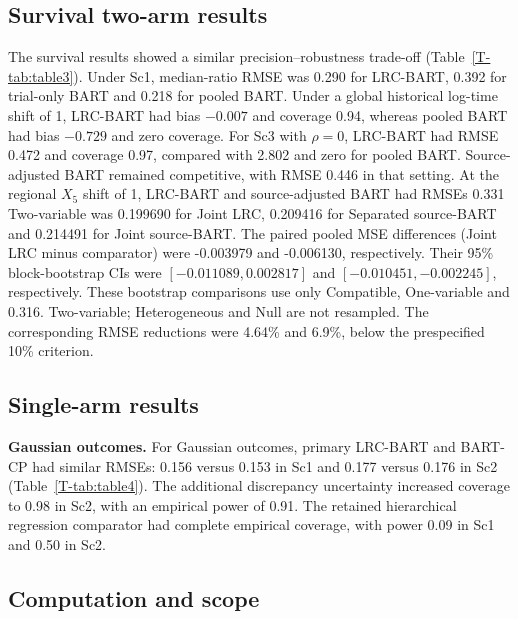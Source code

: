 \documentclass[11pt]{article}
\newcommand{\lrc}{LRC-BART} %
\theoremstyle{remark}\newtheorem{remark}{Remark}[section]
\providecommand{\DIFaddtex}[1]{{\protect\color{blue} \sf #1}} %
\providecommand{\DIFdeltex}[1]{{\protect\color{red} \scriptsize #1}} %
\providecommand{\DIFaddbegin}{} %
\providecommand{\DIFaddend}{} %
\providecommand{\DIFdelbegin}{} %
\providecommand{\DIFdelend}{} %
\providecommand{\DIFadd}[1]{\texorpdfstring{\DIFaddtex{#1}}{#1}} %
\providecommand{\DIFdel}[1]{\texorpdfstring{\DIFdeltex{#1}}{}} %
\begin{document}
\subsection{\DIFdel{Survival two-arm results}}
\addtocounter{subsection}{-1}%
\DIFdel{The survival results showed a similar precision--robustness trade-off (Table~\ref{T-tab:table3}). Under Sc1, median-ratio RMSE was 0.290 for \lrc{}, 0.392 for trial-only BART and 0.218 for pooled BART. Under a global historical log-time shift of 1, \lrc{} had bias $-0.007$ and coverage 0.94, whereas pooled BART had bias $-0.729$ and zero coverage. For Sc3 with $\rho=0$, \lrc{} had RMSE 0.472 and coverage 0.97, compared with 2.802 and zero for pooled BART. Source-adjusted BART remained competitive, with RMSE 0.446 in that setting. At the regional $X_5$ shift of 1, \lrc{} and source-adjusted BART had RMSEs 0.331 }\DIFdelend \DIFaddbegin \DIFadd{Two-variable was 0.199690 for Joint LRC, 0.209416 for Separated source-BART and 0.214491 for Joint source-BART. The paired pooled MSE differences (Joint LRC minus comparator) were -0.003979 and -0.006130, respectively. Their 95\% block-bootstrap CIs were $[-0.011089,0.002817]$ and $[-0.010451,-0.002245]$, respectively. These bootstrap comparisons use only Compatible, One-variable }\DIFaddend and \DIFdelbegin \DIFdel{0.316. }\DIFdelend \DIFaddbegin \DIFadd{Two-variable; Heterogeneous and Null are not resampled. The corresponding RMSE reductions were 4.64\% and 6.9\%, below the prespecified 10\% criterion.
}\DIFaddend 

\DIFdelbegin \subsection{\DIFdel{Single-arm results}}
\addtocounter{subsection}{-1}%
\DIFdel{\textbf{Gaussian outcomes.}
For Gaussian outcomes, primary \lrc{} and BART-CP had similar RMSEs: 0.156 versus 0.153 in Sc1 and 0.177 versus 0.176 in Sc2 (Table~\ref{T-tab:table4}). The additional discrepancy uncertainty increased coverage to 0.98 in Sc2, with an empirical power of 0.91.
The retained hierarchical regression comparator had complete empirical coverage, with power 0.09 in Sc1 and 0.50 in Sc2. }\DIFdelend \DIFaddbegin \subsection{\DIFadd{Computation and scope}}
\DIFaddend 
\end{document}

